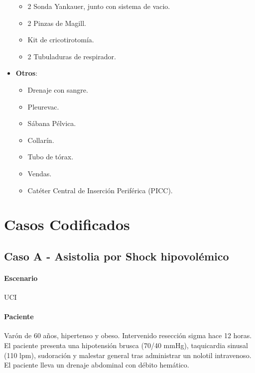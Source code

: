\begin{itemize}[topsep=0pt, partopsep=0pt,itemsep=0pt,parsep=0pt]
\begin{itemize}[topsep=0pt, partopsep=0pt,itemsep=0pt,parsep=0pt]
        \item 2 Sonda Yankauer, junto con sistema de vacio.
        \item 2 Pinzas de Magill.
        \item Kit de cricotirotomía.
        \item 2 Tubuladuras de respirador.
    \end{itemize}
    \item \textbf{Otros}:
    \begin{itemize}[topsep=0pt, partopsep=0pt,itemsep=0pt,parsep=0pt]
        \item Drenaje con sangre.
        \item Pleurevac.
        \item Sábana Pélvica.
        \item Collarín.
        \item Tubo de tórax.
        \item Vendas.
        \item Catéter Central de Inserción Periférica (PICC).
    \end{itemize}
\end{itemize}

\clearpage

\section{Casos Codificados}
\subsection{Caso A - Asistolia por Shock hipovolémico}
\paragraph{Escenario} UCI
\vspace{-12.5pt}
\paragraph{Paciente} Varón de 60 años, hipertenso y obeso. Intervenido resección sigma hace 12 horas. El paciente presenta una hipotensión brusca (70/40 mmHg), taquicardia sinusal (110 lpm), sudoración y malestar general tras administrar un nolotil intravenoso. El paciente lleva un drenaje abdominal con débito hemático.
\vspace{-12.5pt}
